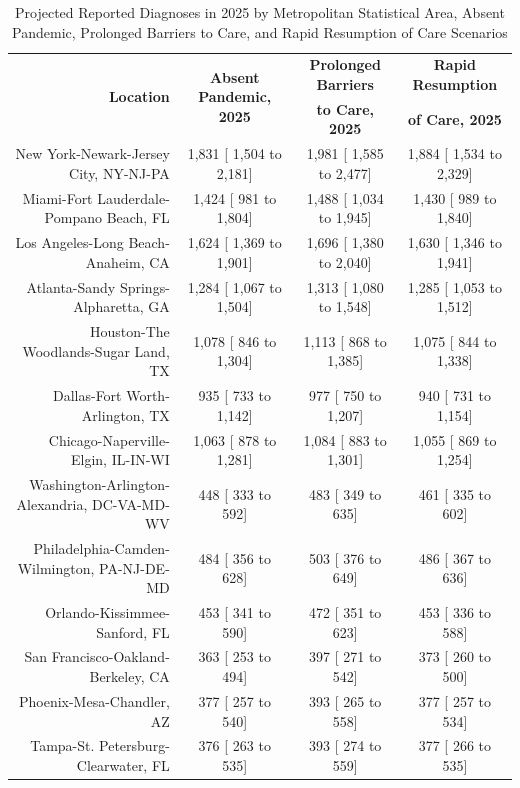 \documentclass{article}
\begin{document}
\begin{table}[H]
	\caption{Projected Reported Diagnoses in 2025 by Metropolitan Statistical Area, Absent Pandemic, Prolonged Barriers to Care, and Rapid Resumption of Care Scenarios}
	\footnotesize
	\begin{tabular}{|r|c|c|c|}
		\hline
		\multirow{2}{*}{\textbf{Location}} & \multirow{2}{*}{\textbf{Absent Pandemic, 2025}} & \textbf{Prolonged Barriers} & \textbf{Rapid Resumption}\\
		&  & \textbf{to Care, 2025} & \textbf{of Care, 2025}\\
		\hline\hline
		New York-Newark-Jersey City, NY-NJ-PA &  1,831 [ 1,504 to  2,181] &  1,981 [ 1,585 to  2,477] &  1,884 [ 1,534 to  2,329]\\
		Miami-Fort Lauderdale-Pompano Beach, FL &  1,424 [   981 to  1,804] &  1,488 [ 1,034 to  1,945] &  1,430 [   989 to  1,840]\\
		Los Angeles-Long Beach-Anaheim, CA &  1,624 [ 1,369 to  1,901] &  1,696 [ 1,380 to  2,040] &  1,630 [ 1,346 to  1,941]\\
		Atlanta-Sandy Springs-Alpharetta, GA &  1,284 [ 1,067 to  1,504] &  1,313 [ 1,080 to  1,548] &  1,285 [ 1,053 to  1,512]\\
		Houston-The Woodlands-Sugar Land, TX &  1,078 [   846 to  1,304] &  1,113 [   868 to  1,385] &  1,075 [   844 to  1,338]\\
		Dallas-Fort Worth-Arlington, TX &    935 [   733 to  1,142] &    977 [   750 to  1,207] &    940 [   731 to  1,154]\\
		Chicago-Naperville-Elgin, IL-IN-WI &  1,063 [   878 to  1,281] &  1,084 [   883 to  1,301] &  1,055 [   869 to  1,254]\\
		Washington-Arlington-Alexandria, DC-VA-MD-WV &    448 [   333 to    592] &    483 [   349 to    635] &    461 [   335 to    602]\\
		Philadelphia-Camden-Wilmington, PA-NJ-DE-MD &    484 [   356 to    628] &    503 [   376 to    649] &    486 [   367 to    636]\\
		Orlando-Kissimmee-Sanford, FL &    453 [   341 to    590] &    472 [   351 to    623] &    453 [   336 to    588]\\
		San Francisco-Oakland-Berkeley, CA &    363 [   253 to    494] &    397 [   271 to    542] &    373 [   260 to    500]\\
		Phoenix-Mesa-Chandler, AZ &    377 [   257 to    540] &    393 [   265 to    558] &    377 [   257 to    534]\\
		Tampa-St. Petersburg-Clearwater, FL &    376 [   263 to    535] &    393 [   274 to    559] &    377 [   266 to    535]\\

\end{tabular}
\end{table}
\end{document}
